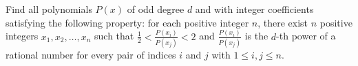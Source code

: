 Find all polynomials $P(x)$ of odd degree $d$ and with integer coefficients satisfying the following property: for each positive integer $n$, there exist $n$ positive integers $x_1, x_2, \ldots, x_n$ such that $\frac{1}{2} < \frac{P(x_i)}{P(x_j)} < 2$ and $\frac{P(x_i)}{P(x_j)}$ is the $d$-th power of a rational number for every pair of indices $i$ and $j$ with $1 \leq i, j \leq n$.
